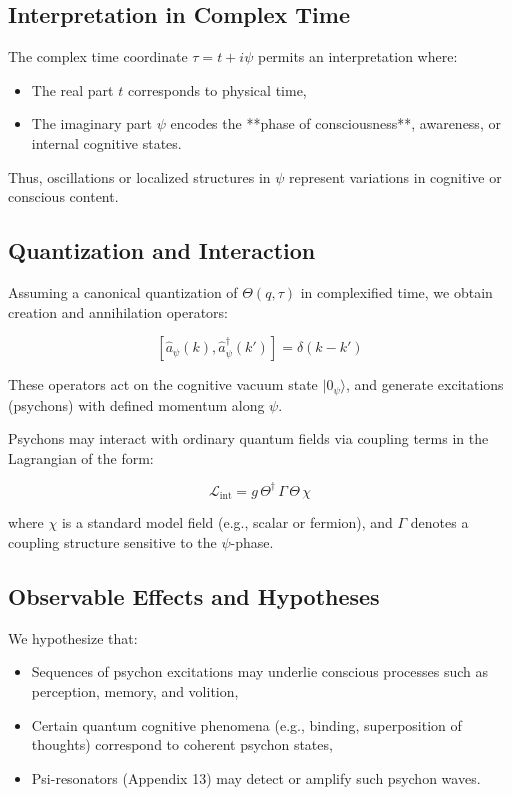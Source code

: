 \subsection*{Interpretation in Complex Time}

The complex time coordinate \(\tau = t + i\psi\) permits an interpretation where:
\begin{itemize}
  \item The real part \(t\) corresponds to physical time,
  \item The imaginary part \(\psi\) encodes the **phase of consciousness**, awareness, or internal cognitive states.
\end{itemize}

Thus, oscillations or localized structures in \(\psi\) represent variations in cognitive or conscious content.

\subsection*{Quantization and Interaction}

Assuming a canonical quantization of \(\Theta(q, \tau)\) in complexified time, we obtain creation and annihilation operators:

\[
[\hat{a}_{\psi}(k), \hat{a}_{\psi}^\dagger(k')] = \delta(k - k')
\]

These operators act on the cognitive vacuum state \(|0_\psi\rangle\), and generate excitations (psychons) with defined
momentum along \(\psi\).

Psychons may interact with ordinary quantum fields via coupling terms in the Lagrangian of the form:

\[
\mathcal{L}_{\text{int}} = g \, \Theta^\dagger \, \Gamma \, \Theta \, \chi
\]

where \(\chi\) is a standard model field (e.g., scalar or fermion), and \(\Gamma\) denotes a coupling structure sensitive
to the \(\psi\)-phase.

\subsection*{Observable Effects and Hypotheses}

We hypothesize that:
\begin{itemize}
  \item Sequences of psychon excitations may underlie conscious processes such as perception, memory, and volition,
  \item Certain quantum cognitive phenomena (e.g., binding, superposition of thoughts) correspond to coherent psychon states,
  \item Psi-resonators (Appendix 13) may detect or amplify such psychon waves.
\end{itemize}

